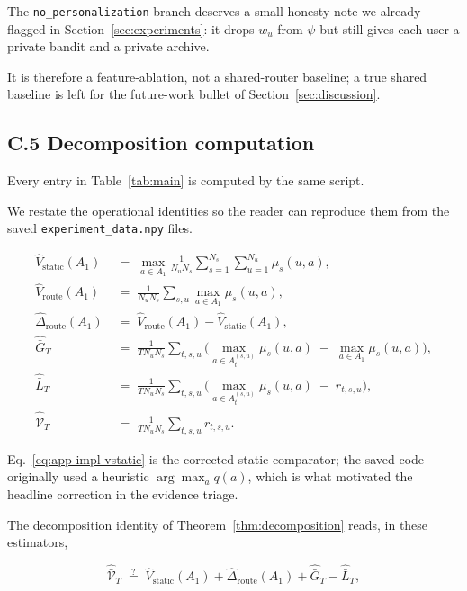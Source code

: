 \documentclass{article} %
\begin{document}
The \texttt{no\_personalization} branch deserves a small honesty note we already flagged in Section~\ref{sec:experiments}: it drops $w_u$ from $\psi$ but still gives each user a private bandit and a private archive.

It is therefore a feature-ablation, not a shared-router baseline; a true shared baseline is left for the future-work bullet of Section~\ref{sec:discussion}.

\subsection{C.5 Decomposition computation}

\label{app:impl-decomp}

Every entry in Table~\ref{tab:main} is computed by the same script.

We restate the operational identities so the reader can reproduce them from the saved \texttt{experiment\_data.npy} files.

\begin{align}
\label{eq:app-impl-vstatic}
\widehat V_{\mathrm{static}}(A_1) &\;=\; \max_{a \in A_1} \frac{1}{N_u N_s}\sum_{s=1}^{N_s}\sum_{u=1}^{N_u} \mu_s(u, a),\\
\label{eq:app-impl-vroute}
\widehat V_{\mathrm{route}}(A_1) &\;=\; \frac{1}{N_u N_s}\sum_{s,u} \max_{a \in A_1} \mu_s(u, a),\\
\label{eq:app-impl-dhet}
\widehat\Delta_{\mathrm{route}}(A_1) &\;=\; \widehat V_{\mathrm{route}}(A_1) - \widehat V_{\mathrm{static}}(A_1),\\
\label{eq:app-impl-Gt}
\widehat{\bar G}_T &\;=\; \frac{1}{T N_u N_s}\sum_{t,s,u}\!\Big(\max_{a \in A_t^{(s,u)}}\mu_s(u, a) \;-\; \max_{a \in A_1}\mu_s(u, a)\Big),\\
\label{eq:app-impl-Lt}
\widehat{\bar L}_T &\;=\; \frac{1}{T N_u N_s}\sum_{t,s,u}\!\Big(\max_{a \in A_t^{(s,u)}}\mu_s(u, a) \;-\; r_{t,s,u}\Big),\\
\label{eq:app-impl-V}
\widehat{\bar{\mathcal V}}_T &\;=\; \frac{1}{T N_u N_s}\sum_{t,s,u} r_{t,s,u}.
\end{align}

Eq.~\eqref{eq:app-impl-vstatic} is the corrected static comparator; the saved code originally used a heuristic $\arg\max_a q(a)$, which is what motivated the headline correction in the evidence triage.

The decomposition identity of Theorem~\ref{thm:decomposition} reads, in these estimators,

\begin{equation}
\label{eq:app-impl-id}
\widehat{\bar{\mathcal V}}_T \;\stackrel{?}{=}\; \widehat V_{\mathrm{static}}(A_1) + \widehat\Delta_{\mathrm{route}}(A_1) + \widehat{\bar G}_T - \widehat{\bar L}_T,
\end{equation}
\end{document}
